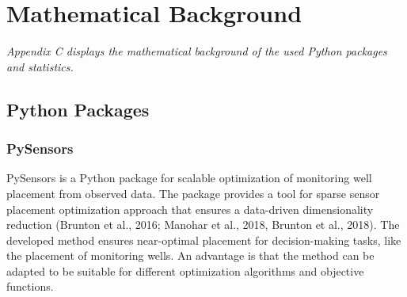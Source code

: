 \chapter{Mathematical Background}

\emph{Appendix C displays the mathematical background of the used Python packages and statistics.}

\section{Python Packages}

\subsection{PySensors}
PySensors is a Python package for scalable optimization of monitoring well placement from observed data. The package provides a tool for sparse sensor placement optimization approach that ensures a data-driven dimensionality reduction (Brunton et al., 2016; Manohar et al., 2018, Brunton et al., 2018). The developed method ensures near-optimal placement for decision-making tasks, like the placement of monitoring wells. An advantage is that the method can be adapted to be suitable for different optimization algorithms and objective functions. 


